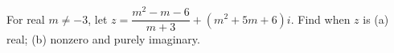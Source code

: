 For real $m\ne-3$, let $z=\dfrac{m^2-m-6}{m+3}+(m^2+5m+6)i$. Find when $z$ is (a) real; (b) nonzero and purely imaginary.
